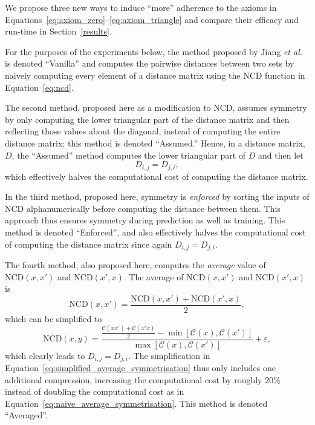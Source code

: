 \documentclass[preprint,12pt]{article}
\begin{document}
We propose three new ways to induce ``more'' adherence to the axioms in Equations~\ref{eq:axiom_zero}--\ref{eq:axiom_triangle} and compare their efficacy and run-time in Section~\ref{results}.

For the purposes of the experiments below, the method proposed by Jiang \textit{et al.}~\cite{jiang2022less} is denoted ``Vanilla'' and computes the pairwise distances between two sets by naively computing every element of a distance matrix using the NCD function in Equation~\ref{eq:ncd}.

The second method, proposed here as a modification to NCD, assumes symmetry by only computing the lower triangular part of the distance matrix and then reflecting those values about the diagonal, instead of computing the entire distance matrix; this method is denoted ``Assumed.''
Hence, in a distance matrix, $D$, the ``Assumed'' method computes the lower triangular part of $D$ and then let
\begin{equation}
    D_{i,j} = D_{j,i},
    \label{eq:assumed}
\end{equation}
which effectively halves the computational cost of computing the distance matrix.

In the third method, proposed here, symmetry is \textit{enforced} by sorting the inputs of NCD alphanumerically before computing the distance between them.
This approach thus ensures symmetry during prediction as well as training.
This method is denoted ``Enforced'', and also effectively halves the computational cost of computing the distance matrix since again $D_{i,j} = D_{j,i}$.

The fourth method, also proposed here, computes the \textit{average} value of $\text{NCD}(x,x')$ and $\text{NCD}(x',x)$.
The average of $\text{NCD}(x,x')$ and $\text{NCD}(x',x)$ is
\begin{equation}
    \label{eq:naive_average_symmetrisation}
    \overline{\text{NCD}}(x,x') = \frac{\text{NCD}(x,x') + \text{NCD}(x', x)}{2},
\end{equation}
which can be simplified to
\begin{equation}
    \label{eq:simplified_average_symmetrisation}
    \overline{\text{NCD}}(x, y) = \frac{\frac{\mathcal{C}(xx') + \mathcal{C}(x'x)}{2} - \min[\mathcal{C}(x), \mathcal{C}(x')]}{\max[\mathcal{C}(x), \mathcal{C}(x')]} + \varepsilon,
\end{equation}
which clearly leads to $D_{i,j}=D_{j,i}$.
The simplification in Equation~\ref{eq:simplified_average_symmetrisation} thus only includes one additional compression, increasing the computational cost by roughly 20\% instead of doubling the computational cost as in Equation~\ref{eq:naive_average_symmetrisation}. This method is denoted ``Averaged''.
\end{document}
